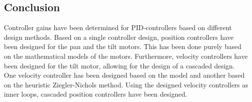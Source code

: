 \documentclass[../../main.tex]{subfiles}
\begin{document}



\subsection{Conclusion}
Controller gains have been determined for PID-controllers based on different design methods. Based on a single controller design, position controllers have been designed for the pan and the tilt motors. This has been done purely based on the mathematical models of the motors. Furthermore, velocity controllers have been designed for the tilt motor, allowing for the design of a cascaded design. One velocity controller has been designed based on the model and another based on the heuristic Ziegler-Nichols method. Using the designed velocity controllers as inner loops, cascaded position controllers have been designed.
\end{document}
